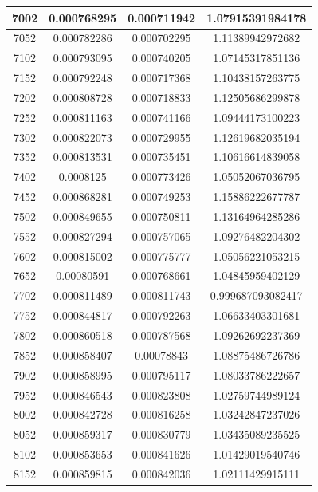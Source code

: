 \documentclass{article}
\begin{document}
\begin{longtable}{|c|c|c|c|}
		7002	&   0.000768295	  & 0.000711942	 &  1.07915391984178   \\ \hline
		7052	&   0.000782286	  & 0.000702295	 &  1.11389942972682   \\ \hline
		7102	&   0.000793095	  & 0.000740205	 &  1.07145317851136   \\ \hline
		7152	&   0.000792248	  & 0.000717368	 &  1.10438157263775   \\ \hline
		7202	&   0.000808728	  & 0.000718833	 &  1.12505686299878   \\ \hline
		7252	&   0.000811163	  & 0.000741166	 &  1.09444173100223   \\ \hline
		7302	&   0.000822073	  & 0.000729955	 &  1.12619682035194   \\ \hline
		7352	&   0.000813531	  & 0.000735451	 &  1.10616614839058   \\ \hline
		7402	&   0.0008125	  & 0.000773426	 &  1.05052067036795   \\ \hline
		7452	&   0.000868281	  & 0.000749253	 &  1.15886222677787   \\ \hline
		7502	&   0.000849655	  & 0.000750811	 &  1.13164964285286   \\ \hline
		7552	&   0.000827294	  & 0.000757065	 &  1.09276482204302   \\ \hline
		7602	&   0.000815002	  & 0.000775777	 &  1.05056221053215   \\ \hline
		7652	&   0.00080591	  & 0.000768661	 &  1.04845959402129   \\ \hline
		7702	&   0.000811489	  & 0.000811743	 &  0.999687093082417   \\ \hline
		7752	&   0.000844817	  & 0.000792263	 &  1.06633403301681   \\ \hline
		7802	&   0.000860518	  & 0.000787568	 &  1.09262692237369   \\ \hline
		7852	&   0.000858407	  & 0.00078843	 &  1.08875486726786   \\ \hline
		7902	&   0.000858995	  & 0.000795117	 &  1.08033786222657   \\ \hline
		7952	&   0.000846543	  & 0.000823808	 &  1.02759744989124   \\ \hline
		8002	&   0.000842728	  & 0.000816258	 &  1.03242847237026   \\ \hline
		8052	&   0.000859317	  & 0.000830779	 &  1.03435089235525   \\ \hline
		8102	&   0.000853653	  & 0.000841626	 &  1.01429019540746   \\ \hline
		8152	&   0.000859815	  & 0.000842036	 &  1.02111429915111   \\ \hline

\end{longtable}
\end{document}
